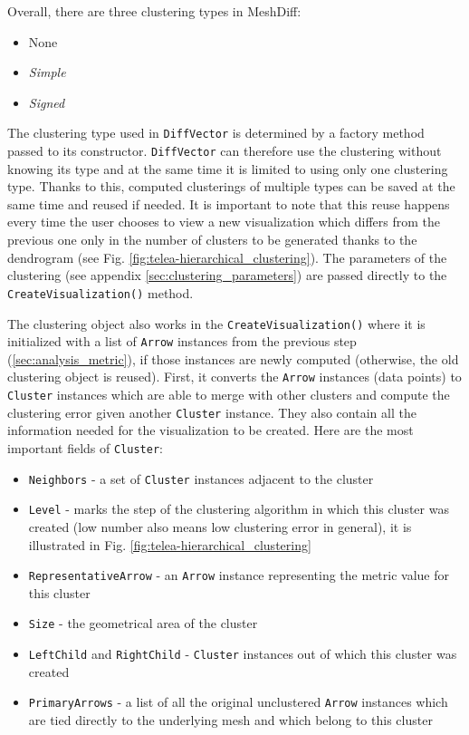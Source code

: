 Overall, there are three clustering types in MeshDiff:

\begin{itemize}
\item None
\item {\it Simple}
\item {\it Signed}
\end{itemize}

The clustering type used in \verb+DiffVector+ is determined by a factory method passed to its constructor. \verb+DiffVector+ can therefore use the clustering without knowing its type and at the same time it is limited to using only one clustering type. Thanks to this, computed clusterings of multiple types can be saved at the same time and reused if needed. It is important to note that this reuse happens every time the user chooses to view a new visualization which differs from the previous one only in the number of clusters to be generated thanks to the dendrogram (see Fig. \ref{fig:telea-hierarchical_clustering}). The parameters of the clustering (see appendix \ref{sec:clustering_parameters}) are passed directly to the \verb+CreateVisualization()+ method.

The clustering object also works in the \verb+CreateVisualization()+ where it is initialized with a list of \verb+Arrow+ instances from the previous step (\ref{sec:analysis_metric}), if those instances are newly computed (otherwise, the old clustering object is reused). First, it converts the \verb+Arrow+ instances (data points) to \verb+Cluster+ instances which are able to merge with other clusters and compute the clustering error given another \verb+Cluster+ instance. They also contain all the information needed for the visualization to be created. Here are the most important fields of \verb+Cluster+:

\begin{itemize}
\item \verb+Neighbors+ - a set of \verb+Cluster+ instances adjacent to the cluster
\item \verb+Level+ - marks the step of the clustering algorithm in which this cluster was created (low number also means low clustering error in general), it is illustrated in Fig. \ref{fig:telea-hierarchical_clustering}
\item \verb+RepresentativeArrow+ - an \verb+Arrow+ instance representing the metric value for this cluster
\item \verb+Size+ - the geometrical area of the cluster
\item \verb+LeftChild+ and \verb+RightChild+ - \verb+Cluster+ instances out of which this cluster was created
\item \verb+PrimaryArrows+ - a list of all the original unclustered \verb+Arrow+ instances which are tied directly to the underlying mesh and which belong to this cluster
\end{itemize}

